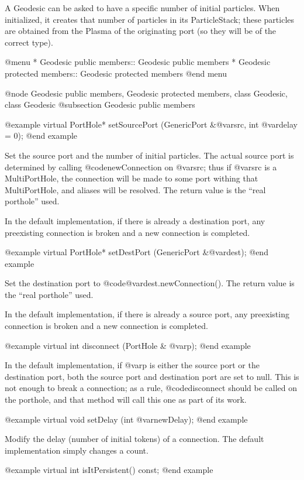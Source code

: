 A Geodesic can be asked to have a specific number of initial particles.
When initialized, it creates that number of particles in its
ParticleStack; these particles are obtained from the Plasma of the
originating port (so they will be of the correct type).

@menu
* Geodesic public members::     Geodesic public members
* Geodesic protected members::  Geodesic protected members
@end menu

@node Geodesic public members, Geodesic protected members, class Geodesic, class Geodesic
@subsection Geodesic public members

@example
virtual PortHole* setSourcePort (GenericPort &@var{src}, int @var{delay} = 0);
@end example

Set the source port and the number of initial particles.  The actual
source port is determined by calling @code{newConnection} on @var{src};
thus if @var{src} is a MultiPortHole, the connection will be made to
some port withing that MultiPortHole, and aliases will be resolved.
The return value is the ``real porthole'' used.

In the default implementation, if there is already a destination port,
any preexisting connection is broken and a new connection is completed.


@example
virtual PortHole* setDestPort (GenericPort &@var{dest});
@end example

Set the destination port to @code{@var{dest}.newConnection()}.  The
return value is the ``real porthole'' used.

In the default implementation, if there is already a source port,
any preexisting connection is broken and a new connection is completed.

@example
virtual int disconnect (PortHole & @var{p});
@end example

In the default implementation, if @var{p} is either the source port or
the destination port, both the source port and destination port are set
to null.  This is not enough to break a connection; as a rule,
@code{disconnect} should be called on the porthole, and that method
will call this one as part of its work.

@example
virtual void setDelay (int @var{newDelay});
@end example

Modify the delay (number of initial tokens) of a connection.  The
default implementation simply changes a count.

@example
virtual int isItPersistent() const;
@end example

